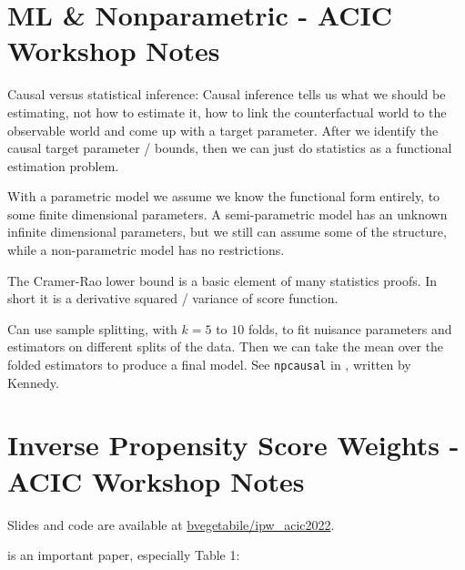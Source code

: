 \section{ML \& Nonparametric - ACIC Workshop Notes}
\label{cause:ml_nonparametric_ACIC}

Causal versus statistical inference:
Causal inference tells us what we should be estimating, not how to estimate it,
\ie how to link the counterfactual world to the observable world and come up with a target parameter.
After we identify the causal target parameter / bounds, then we can just do statistics as a functional estimation problem.

With a parametric model we assume we know the functional form entirely, to some finite dimensional parameters.
A semi-parametric model has an unknown infinite dimensional parameters, but we still can assume some of the structure,
while a non-parametric model has no restrictions.

The Cramer-Rao lower bound is a basic element of many statistics proofs. In short it is a derivative squared / variance of score function.

Can use sample splitting, with $k=5$ to $10$ folds, to fit nuisance parameters and estimators on different splits of the data.
Then we can take the mean over the folded estimators to produce a final model.
See \texttt{npcausal} in \R, written by Kennedy.

\section{Inverse Propensity Score Weights - ACIC Workshop Notes}
\label{cause:inverse_propensity_score_weights_ACIC}

Slides and \R code are available at \href{https://www.github.com/bvegetabile/ipw_acic2022}{bvegetabile/ipw\_acic2022}.

\cite{Li_2017} is an important paper, especially Table 1:

